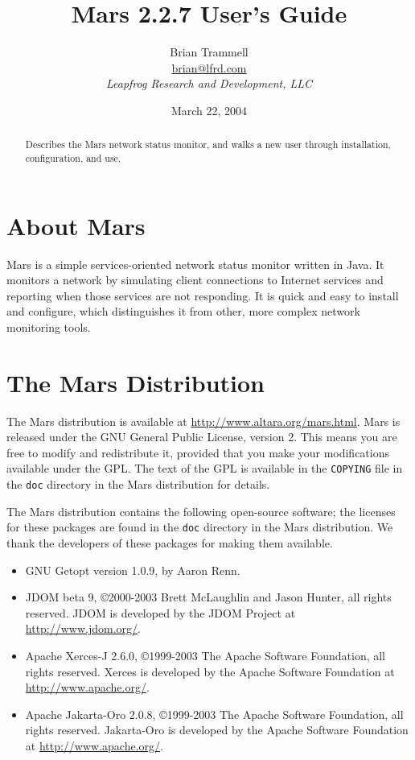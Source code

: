 \documentclass{article}
\title{Mars 2.2.7 User's Guide}
\author{Brian Trammell\\
\url{brian@lfrd.com}\\
{\small \sl Leapfrog Research and Development, LLC}}
\date{March 22, 2004}
\newcommand{\filename}[1]{{\tt #1}}
\begin{document}
\sloppy
\maketitle

\begin{abstract}
Describes the Mars network status monitor, and walks a new user through
installation, configuration, and use.
\end{abstract}

\tableofcontents

\section{About Mars}

Mars is a simple services-oriented network status monitor written in
Java. It monitors a network by simulating client connections to
Internet services and reporting when those services are not
responding. It is quick and easy to install and configure, which
distinguishes it from other, more complex network monitoring tools.

\section{The Mars Distribution}

The Mars distribution is available at
\url{http://www.altara.org/mars.html}.  Mars is released under the GNU
General Public License, version 2.  This means you are free to modify
and redistribute it, provided that you make your modifications
available under the GPL. The text of the GPL is available in the
\filename{COPYING} file in the \filename{doc} directory in the Mars
distribution for details.

The Mars distribution contains the following open-source software; the
licenses for these packages are found in the \filename{doc} directory
in the Mars distribution. We thank the developers of these packages
for making them available.

\begin{itemize}
\item GNU Getopt version 1.0.9, by Aaron Renn. 
\item JDOM beta 9, \copyright 2000-2003 Brett McLaughlin and Jason
  Hunter, all rights reserved. JDOM is developed by the JDOM Project
  at \url{http://www.jdom.org/}.
\item Apache Xerces-J 2.6.0, \copyright 1999-2003 The Apache Software
  Foundation, all rights reserved. Xerces is developed by the Apache
  Software Foundation at \url{http://www.apache.org/}.
\item Apache Jakarta-Oro 2.0.8, \copyright 1999-2003 The Apache
  Software Foundation, all rights reserved. Jakarta-Oro is developed
  by the Apache Software Foundation at \url{http://www.apache.org/}.
\end{itemize}
\end{document}
